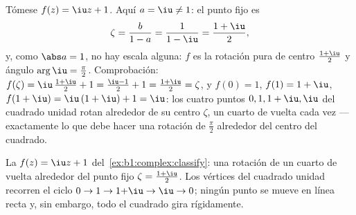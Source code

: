 \begin{example}\label{ex:b1:complex:classify}
Tómese $f(z) = \iu z + 1$. Aquí $a = \iu \neq 1$: el punto fijo es
\[
\zeta = \frac{b}{1 - a} = \frac1{1 - \iu}
= \frac{1 + \iu}{2},
\]
y, como $\abs a = 1$, no hay escala alguna: $f$ es la rotación pura de
centro $\frac{1+\iu}2$ y ángulo $\arg \iu = \frac\pi2$. Comprobación:
$f(\zeta) = \iu\,\frac{1+\iu}2 + 1 = \frac{\iu - 1}2 + 1 =
\frac{1 + \iu}2 = \zeta$, y $f(0) = 1$, $f(1) = 1 + \iu$,
$f(1 + \iu) = \iu\,(1 + \iu) + 1 = \iu$: los cuatro puntos
$0, 1, 1+\iu, \iu$ del cuadrado unidad rotan alrededor de su centro
$\zeta$, un cuarto de vuelta cada vez --- exactamente lo que debe hacer
una rotación de $\frac\pi2$ alrededor del centro del cuadrado.
\end{example}

\begin{omfigure}

{\small La  $f(z) = \iu z + 1$
del~\cref{ex:b1:complex:classify}: una rotación de un cuarto de vuelta
alrededor del punto fijo $\zeta = \frac{1+\iu}2$. Los vértices del
cuadrado unidad recorren el ciclo $0 \to 1 \to 1{+}\iu \to \iu \to 0$;
ningún punto se mueve en línea recta y, sin embargo, todo el cuadrado
gira rígidamente.}
\end{omfigure}

